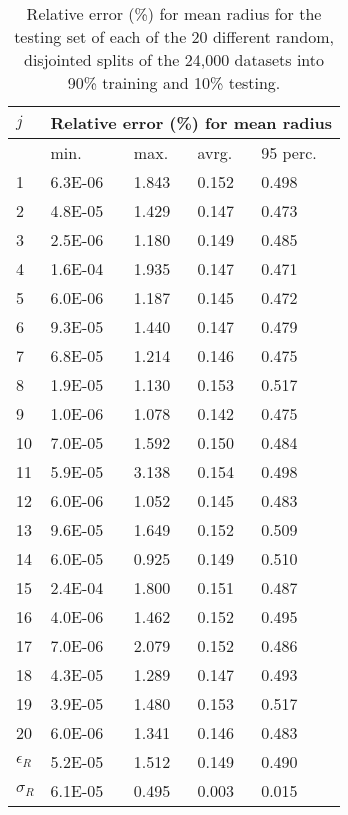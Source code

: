 					
\begin{table}[ht]
  \centering
  \caption{Relative error (\%) for mean radius for the testing set of each of the
  20 different random, disjointed splits of the 24,000 datasets into 90\% training
  and 10\% testing.}
\begin{tabular}{lllll}
\hline
\hline
     $j$ & \multicolumn{4}{c}{Relative error (\%) for mean radius} \\
    \hline
			     &min. & max. & avrg. & 95 perc.  \\
\hline
     1 & 6.3E-06 & 1.843 & 0.152 & 0.498 \\
	2	& 4.8E-05 &	1.429 &	0.147 &	0.473 \\
	3	& 2.5E-06 &	1.180 &	0.149 &	0.485 \\
   	4	& 1.6E-04 &	1.935 &	0.147 &	0.471 \\
	5	& 6.0E-06 & 1.187 &	0.145 &	0.472 \\
	6  & 9.3E-05 &	1.440 &	0.147 &	0.479 \\
	7  & 6.8E-05 &	1.214 &	0.146 &	0.475 \\
	8  & 1.9E-05 &	1.130 &	0.153 &	0.517 \\
	9  & 1.0E-06 &	1.078 & 0.142 & 0.475 \\
	10  & 7.0E-05 & 1.592 & 0.150 & 0.484 \\
	11  & 5.9E-05 & 3.138 & 0.154 & 0.498 \\
	12  & 6.0E-06 & 1.052 & 0.145 & 0.483 \\
	13  & 9.6E-05 & 1.649 & 0.152 & 0.509 \\
	14  & 6.0E-05 & 0.925 & 0.149 & 0.510 \\
	15  & 2.4E-04 & 1.800 & 0.151 & 0.487 \\
	16  & 4.0E-06 & 1.462 & 0.152 & 0.495 \\
	17  & 7.0E-06 & 2.079 & 0.152 & 0.486 \\
	18  & 4.3E-05 & 1.289 & 0.147 & 0.493 \\
	19  & 3.9E-05 & 1.480 & 0.153 & 0.517 \\
	20  & 6.0E-06 & 1.341 & 0.146 & 0.483 \\
	 \hline			
$\epsilon_R$  & 5.2E-05 & 1.512 & 0.149 & 0.490 \\
 	\hline
 $\sigma_R $  & 6.1E-05 & 0.495 & 0.003 & 0.015 \\

     \hline
 \end{tabular} \label{tab_Error_mean_radius}%
\end{table}


